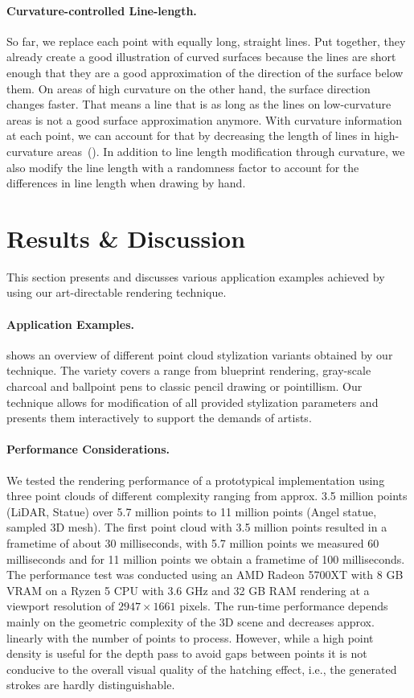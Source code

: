 \documentclass[a4paper,twoside]{article}
\newcommand{\ie}{i.e.,\xspace}
\begin{document}
\paragraph{Curvature-controlled Line-length.}
%
So far, we replace each point with equally long, straight lines.
Put together, they already create a good illustration of curved surfaces because the lines are short enough that they are a good approximation of the direction of the surface below them.
On areas of high curvature on the other hand, the surface direction changes faster. That means a line that is as long as the lines on low-curvature areas is not a good surface approximation anymore.
With curvature information at each point, we can account for that by decreasing the length of lines in high-curvature areas~().
%
In addition to line length modification through curvature, we also modify the line length with a randomness factor to account for the differences in line length when drawing by hand.




\section{Results \& Discussion}
\label{PCNPR:Sec:ApplicationsAndDiscussion}
%
This section presents and discusses various application examples achieved by using our art-directable rendering technique.


\paragraph{Application Examples.}
%
 shows an overview of different point cloud stylization variants obtained by our technique.
The variety covers a range from blueprint rendering, gray-scale charcoal and ballpoint pens to classic pencil drawing
or pointillism.
Our technique allows for modification of all provided stylization parameters and presents them interactively to 
support the demands of artists.


\paragraph{Performance Considerations.}
%
We tested the rendering performance of a prototypical implementation using three point clouds of different complexity ranging
from approx. 3.5 million points (LiDAR, Statue) over 5.7 million points to  11 million points (Angel statue, sampled 3D mesh). The first point cloud with 3.5 million points resulted in a frametime of about 30 milliseconds, with 5.7 million points we measured 60 milliseconds and for 11 million points we obtain a frametime of 100 milliseconds.
The performance test was conducted using an AMD Radeon 5700XT with 8 GB VRAM on a Ryzen 5 CPU with 3.6 GHz and 32 GB RAM
rendering at a viewport resolution of $2947 \times 1661$ pixels.
The run-time performance depends mainly on the geometric complexity of the 3D  scene and decreases approx. linearly with the number of points to process.
However, while a high point density is useful for the depth pass to avoid gaps between points it is 
not conducive to the overall visual quality of the hatching effect, \ie the generated strokes are hardly distinguishable.
\end{document}

